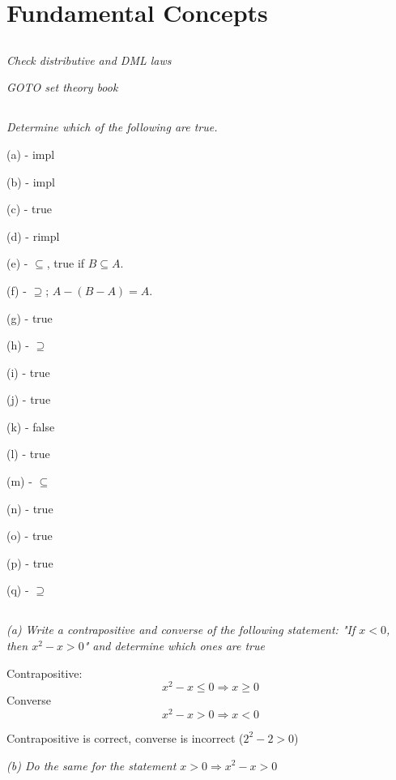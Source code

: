 \documentclass[11pt,oneside,titlepage]{book}
\DeclareMathOperator \ra {\Rightarrow}
\begin{document}
\section{Fundamental Concepts}

\subsection{}

\textit{Check distributive and DML laws}

\textit{GOTO set theory book}

\subsection{}

\textit{Determine which of the following are true.}

(a) - impl

(b) - impl

(c) - true

(d) - rimpl

(e) - $\subseteq$, true if $B \subseteq A$.

(f) - $\supseteq$;   $A - (B - A) = A$.

(g) - true

(h) - $\supseteq$

(i) - true

(j) - true

(k) - false

(l) - true

(m) - $\subseteq$

(n) - true

(o) - true

(p) - true

(q) - $\supseteq$

\subsection{}

\textit{(a) Write a contrapositive and converse of the following statement:
  "If $x < 0$, then $x^2 - x > 0$" and determine which ones are true}

Contrapositive:
$$x^2 - x \leq 0 \ra x \geq 0$$
Converse
$$x^2 - x > 0 \ra x < 0$$

Contrapositive is correct, converse is incorrect ($2^2 - 2 > 0$)

\textit{(b) Do the same for the statement $x > 0 \ra x^2 - x > 0$}
\end{document}
